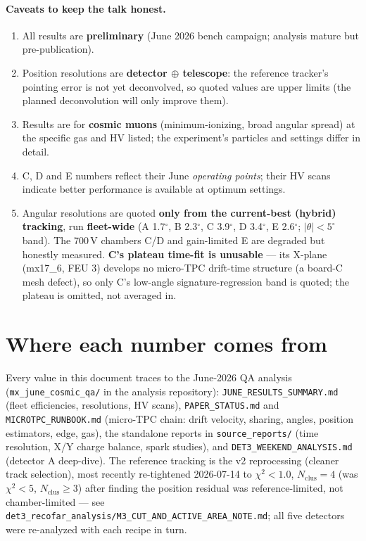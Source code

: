 \documentclass[11pt]{article}
\begin{document}
\paragraph{Caveats to keep the talk honest.}
\begin{enumerate}
  \item All results are \textbf{preliminary} (June 2026 bench campaign;
  analysis mature but pre-publication).
  \item Position resolutions are \textbf{detector $\oplus$ telescope}: the
  reference tracker's pointing error is not yet deconvolved, so quoted values
  are upper limits (the planned deconvolution will only improve them).
  \item Results are for \textbf{cosmic muons} (minimum-ionizing, broad angular
  spread) at the specific gas and HV listed; the experiment's particles and
  settings differ in detail.
  \item C, D and E numbers reflect their June \emph{operating points};
  their HV scans indicate better performance is available at optimum settings.
  \item Angular resolutions are quoted \textbf{only from the current-best
  (hybrid) tracking}, run \textbf{fleet-wide} (A 1.7$^\circ$, B 2.3$^\circ$,
  C 3.9$^\circ$, D 3.4$^\circ$, E 2.6$^\circ$; $|\theta|<5^\circ$ band). The 700\,V
  chambers C/D and gain-limited E are degraded but honestly measured. \textbf{C's
  plateau time-fit is unusable} --- its X-plane (mx17\_6, FEU 3) develops no
  micro-TPC drift-time structure (a board-C mesh defect), so only C's low-angle
  signature-regression band is quoted; the plateau is omitted, not averaged in.
\end{enumerate}

\appendix
\section{Where each number comes from}

Every value in this document traces to the June-2026 QA analysis
(\texttt{mx\_june\_cosmic\_qa/} in the analysis repository):
\texttt{JUNE\_RESULTS\_SUMMARY.md} (fleet efficiencies, resolutions, HV scans),
\texttt{PAPER\_STATUS.md} and \texttt{MICROTPC\_RUNBOOK.md} (micro-TPC chain:
drift velocity, sharing, angles, position estimators, edge, gas),
the standalone reports in \texttt{source\_reports/} (time resolution, X/Y
charge balance, spark studies), and \texttt{DET3\_WEEKEND\_ANALYSIS.md}
(detector A deep-dive). The reference tracking is the v2 reprocessing (cleaner
track selection), most recently re-tightened 2026-07-14 to $\chi^2<1.0$,
$N_\mathrm{clus}=4$ (was $\chi^2<5$, $N_\mathrm{clus}\ge3$) after finding the
position residual was reference-limited, not chamber-limited --- see
\texttt{det3\_recofar\_analysis/M3\_CUT\_AND\_ACTIVE\_AREA\_NOTE.md}; all five
detectors were re-analyzed with each recipe in turn.
\end{document}

